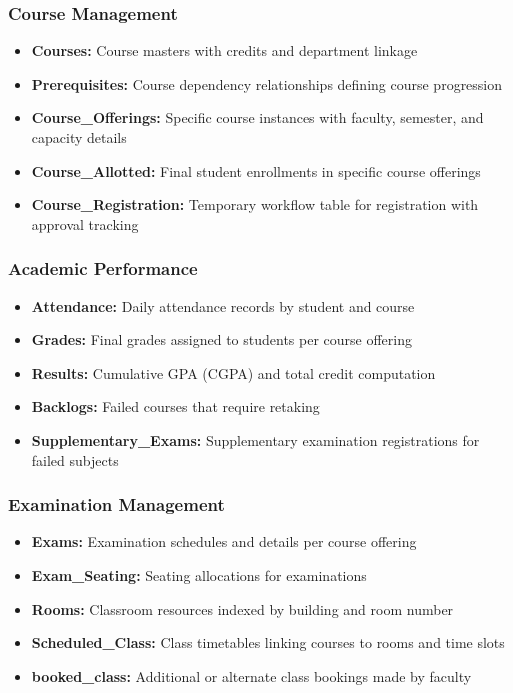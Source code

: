 \documentclass[12pt]{article}
\begin{document}
\subsubsection{Course Management}
\begin{itemize}
    \item \textbf{Courses:} Course masters with credits and department linkage
    \item \textbf{Prerequisites:} Course dependency relationships defining course progression
    \item \textbf{Course\_Offerings:} Specific course instances with faculty, semester, and capacity details
    \item \textbf{Course\_Allotted:} Final student enrollments in specific course offerings
    \item \textbf{Course\_Registration:} Temporary workflow table for registration with approval tracking
\end{itemize}

\subsubsection{Academic Performance}
\begin{itemize}
    \item \textbf{Attendance:} Daily attendance records by student and course
    \item \textbf{Grades:} Final grades assigned to students per course offering
    \item \textbf{Results:} Cumulative GPA (CGPA) and total credit computation
    \item \textbf{Backlogs:} Failed courses that require retaking
    \item \textbf{Supplementary\_Exams:} Supplementary examination registrations for failed subjects
\end{itemize}

\subsubsection{Examination Management}
\begin{itemize}
    \item \textbf{Exams:} Examination schedules and details per course offering
    \item \textbf{Exam\_Seating:} Seating allocations for examinations
    \item \textbf{Rooms:} Classroom resources indexed by building and room number
    \item \textbf{Scheduled\_Class:} Class timetables linking courses to rooms and time slots
    \item \textbf{booked\_class:} Additional or alternate class bookings made by faculty
\end{itemize}
\end{document}
